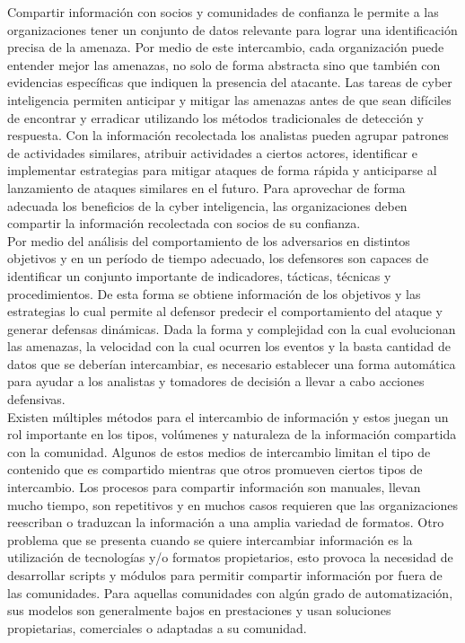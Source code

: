 Compartir información con socios y comunidades de confianza le permite a las 
organizaciones tener un conjunto de datos relevante para lograr una 
identificación precisa de la amenaza. Por medio de este intercambio, cada organización 
puede entender mejor las amenazas, no 
solo de forma abstracta sino que también con evidencias específicas que 
indiquen la presencia del atacante. Las tareas de cyber inteligencia permiten 
anticipar y mitigar las amenazas antes de que sean difíciles de encontrar y 
erradicar utilizando los métodos tradicionales de detección y respuesta. Con la 
información recolectada los analistas pueden agrupar patrones de actividades 
similares, atribuir actividades a ciertos actores, identificar e implementar 
estrategias para mitigar ataques de forma rápida y anticiparse al lanzamiento de 
ataques similares en el futuro. Para aprovechar de forma adecuada los beneficios 
de la cyber inteligencia, las organizaciones deben compartir la información 
recolectada con socios de su confianza.\\

Por medio del análisis del comportamiento de los adversarios en distintos 
objetivos y en un período de tiempo adecuado, los defensores son capaces de 
identificar un conjunto importante de indicadores, tácticas, técnicas y 
procedimientos. De esta forma se obtiene información de los objetivos y las 
estrategias lo cual permite al defensor predecir el comportamiento del ataque y 
generar defensas dinámicas. Dada la forma y complejidad con la cual evolucionan 
las amenazas, la velocidad con la cual ocurren los eventos y la basta cantidad 
de datos que se deberían intercambiar, es necesario establecer una forma 
automática para ayudar a los analistas y tomadores de decisión a llevar a cabo 
acciones defensivas.\\

Existen múltiples métodos para el intercambio de información y estos juegan un rol 
importante en los tipos, volúmenes y naturaleza de la información compartida 
con la comunidad. Algunos de estos medios de intercambio limitan el tipo de 
contenido que es compartido mientras que otros promueven ciertos tipos de 
intercambio. Los procesos para compartir información son manuales, llevan mucho 
tiempo, son repetitivos y en muchos casos requieren que las organizaciones 
reescriban o traduzcan la información a una amplia variedad de formatos. Otro 
problema que se presenta cuando se quiere intercambiar información es la 
utilización de tecnologías y/o formatos propietarios, esto provoca la necesidad 
de desarrollar scripts y módulos para permitir compartir información por fuera 
de las comunidades. Para aquellas comunidades con algún grado de automatización, 
sus modelos son generalmente bajos en prestaciones y usan soluciones 
propietarias, comerciales o adaptadas a su comunidad.\\

